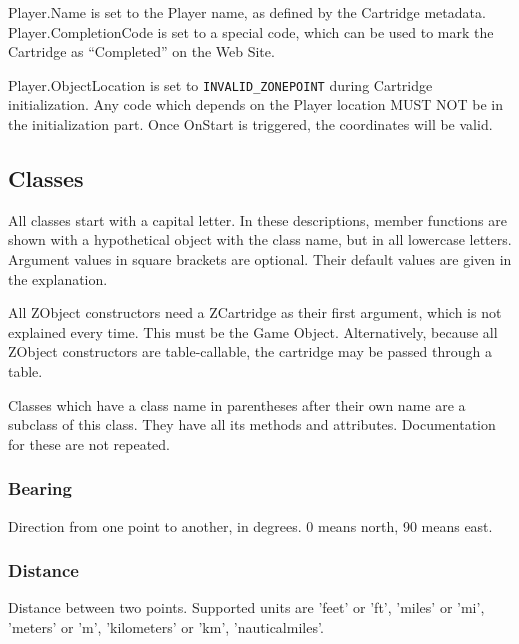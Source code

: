 \documentclass{article}
\begin{document}
Player.Name is set to the Player name, as defined by the Cartridge metadata.
Player.CompletionCode is set to a special code, which can be used to mark the
Cartridge as ``Completed'' on the Web Site.

Player.ObjectLocation is set to \verb-INVALID_ZONEPOINT- during Cartridge
initialization. Any code which depends on the Player location MUST NOT be in
the initialization part. Once OnStart is triggered, the coordinates will be
valid.

\subsection{Classes}
All classes start with a capital letter. In these descriptions, member
functions are shown with a hypothetical object with the class name, but in all
lowercase letters. Argument values in square brackets are optional. Their
default values are given in the explanation.

All ZObject constructors need a ZCartridge as their first argument, which is
not explained every time. This must be the Game Object. Alternatively, because
all ZObject constructors are table-callable, the cartridge may be passed
through a table.

Classes which have a class name in parentheses after their own name are a
subclass of this class. They have all its methods and attributes. Documentation
for these are not repeated.

\subsubsection{Bearing}
Direction from one point to another, in degrees. 0 means north, 90 means east.

\subsubsection{Distance}
Distance between two points.
Supported units are 'feet' or 'ft', 'miles' or 'mi', 'meters' or 'm', 'kilometers' or 'km', 'nauticalmiles'.
\end{document}
